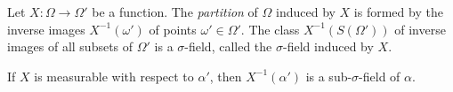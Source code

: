Let $X: \Omega \to \Omega'$ be a function. The \textit{partition} of $\Omega$ induced by $X$ is formed by the inverse images $X^{-1}(\omega')$ of points $\omega' \in \Omega'$. The class $X^{-1}(S(\Omega'))$ of inverse images of all subsets of $\Omega'$ is a $\sigma$-field, called the $\sigma$-field induced by $X$.

If $X$ is measurable with respect to $\alpha'$, then $X^{-1}(\alpha')$ is a sub-$\sigma$-field of $\alpha$.
